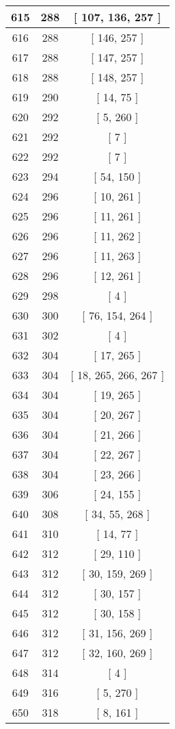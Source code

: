 \begin{center}
\begin{longtable}[H]{|| c c c ||}
615 & 288 & [ 107, 136, 257 ]
\\\hline
616 & 288 & [ 146, 257 ]
\\\hline
617 & 288 & [ 147, 257 ]
\\\hline
618 & 288 & [ 148, 257 ]
\\\hline
619 & 290 & [ 14, 75 ]
\\\hline
620 & 292 & [ 5, 260 ]
\\\hline
621 & 292 & [ 7 ]
\\\hline
622 & 292 & [ 7 ]
\\\hline
623 & 294 & [ 54, 150 ]
\\\hline
624 & 296 & [ 10, 261 ]
\\\hline
625 & 296 & [ 11, 261 ]
\\\hline
626 & 296 & [ 11, 262 ]
\\\hline
627 & 296 & [ 11, 263 ]
\\\hline
628 & 296 & [ 12, 261 ]
\\\hline
629 & 298 & [ 4 ]
\\\hline
630 & 300 & [ 76, 154, 264 ]
\\\hline
631 & 302 & [ 4 ]
\\\hline
632 & 304 & [ 17, 265 ]
\\\hline
633 & 304 & [ 18, 265, 266, 267 ]
\\\hline
634 & 304 & [ 19, 265 ]
\\\hline
635 & 304 & [ 20, 267 ]
\\\hline
636 & 304 & [ 21, 266 ]
\\\hline
637 & 304 & [ 22, 267 ]
\\\hline
638 & 304 & [ 23, 266 ]
\\\hline
639 & 306 & [ 24, 155 ]
\\\hline
640 & 308 & [ 34, 55, 268 ]
\\\hline
641 & 310 & [ 14, 77 ]
\\\hline
642 & 312 & [ 29, 110 ]
\\\hline
643 & 312 & [ 30, 159, 269 ]
\\\hline
644 & 312 & [ 30, 157 ]
\\\hline
645 & 312 & [ 30, 158 ]
\\\hline
646 & 312 & [ 31, 156, 269 ]
\\\hline
647 & 312 & [ 32, 160, 269 ]
\\\hline
648 & 314 & [ 4 ]
\\\hline
649 & 316 & [ 5, 270 ]
\\\hline
650 & 318 & [ 8, 161 ]
\\\hline

\end{longtable}
\end{center}
